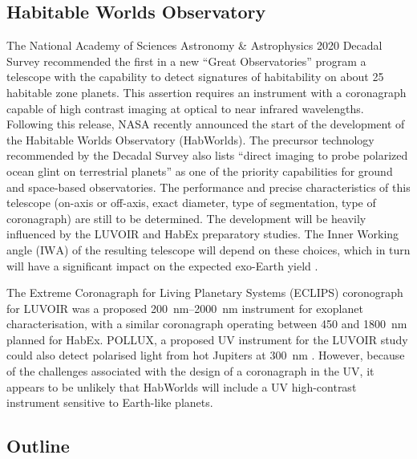 \documentclass[
    usenatbib,
]{mnras}
\newcommand{\IWA}{\ensuremath{\mathrm{IWA}}}
\newcommand{\hwo}{HabWorlds}
\begin{document}
\subsection{Habitable Worlds Observatory}

The National Academy of Sciences Astronomy \& Astrophysics 2020 Decadal Survey \citep{decadal} recommended the first in a new \enquote{Great Observatories} program a telescope with the capability to detect signatures of habitability on about 25 habitable zone planets.
%
This assertion requires an instrument with a coronagraph capable of high contrast imaging at optical to near infrared wavelengths.
%
Following this release, NASA recently announced the start of the development of the Habitable Worlds Observatory (\hwo).
%
The precursor technology recommended by the Decadal Survey also lists ``direct imaging to probe polarized ocean glint on terrestrial planets'' as one of the priority capabilities \citep[Box E.1 in][]{decadal} for ground and space-based observatories.
%
The performance and precise characteristics of this telescope (on-axis or off-axis, exact diameter, type of segmentation, type of coronagraph) are still to be determined.
%
The development will be heavily influenced by the LUVOIR \citep{LUVOIR2019} and HabEx \citep{HabEx_2020} preparatory studies.
%
The Inner Working angle (\IWA) of the resulting telescope will depend on these choices, which in turn will have a significant impact on the expected exo-Earth yield \citep{Stark2019_exoplanetyield}.

The Extreme Coronagraph for Living Planetary Systems (ECLIPS) coronograph for LUVOIR was a proposed \SIrange{200}{2000}{\nano\meter} instrument for exoplanet characterisation, with a similar coronagraph operating between \num{450} and \SI{1800}{\nano\meter} planned for HabEx.
%
POLLUX, a proposed UV instrument for the LUVOIR study could also detect  polarised light from hot Jupiters at \SI{300}{\nano\meter} \citep{Bouret2018_pollux}.
%
However, because of the challenges associated with the design of a coronagraph in the UV, it appears to be unlikely that \hwo{} will include a UV high-contrast instrument sensitive to Earth-like planets.


\subsection{Outline}
\end{document}
